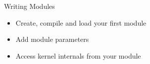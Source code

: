 \setuplabframe
{Writing Modules}
{
  \begin{itemize}
  \item Create, compile and load your first module
  \item Add module parameters
  \item Access kernel internals from your module
  \end{itemize}
}
